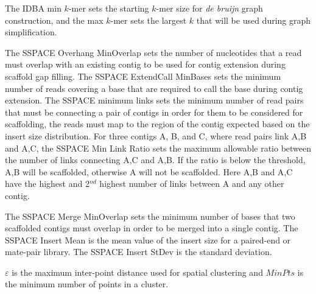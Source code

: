 \documentclass{bioinfo}
\begin{document}
The IDBA min $k$-mer sets the starting $k$-mer size for \emph{de bruijn} graph construction, and the max $k$-mer sets
the largest $k$ that will be used during graph simplification.

The SSPACE Overhang MinOverlap sets the number of nucleotides that a read must overlap with an existing
contig to be used for contig extension during scaffold gap filling. The SSPACE ExtendCall MinBases sets the minimum
number of reads covering a base that are required to call the base during contig extension. The SSPACE minimum
links sets the minimum number of read pairs that must be connecting a pair of contigs in order for them to be considered
for scaffolding, the reads must map to the region of the contig expected based on the insert size distribution.
For three contigs A, B, and C, where read pairs link A,B and A,C, the SSPACE Min Link Ratio sets the 
maximum allowable ratio between the number of links connecting A,C and A,B. If the ratio is below the threshold,
A,B will be scaffolded, otherwise A will not be scaffolded. Here A,B and A,C have the highest and 2$^{nd}$ highest number
of links between A and any other contig.

The SSPACE Merge MinOverlap sets the minimum number of bases that two scaffolded contigs must overlap in order to be merged
into a single contig.  The SSPACE Insert Mean is the mean value of the insert size for a paired-end or mate-pair library. 
The SSPACE Insert StDev is the standard deviation.

$\varepsilon$ is the maximum inter-point distance used for spatial clustering and $MinPts$ is the minimum number of points
in a cluster.
\end{document}
